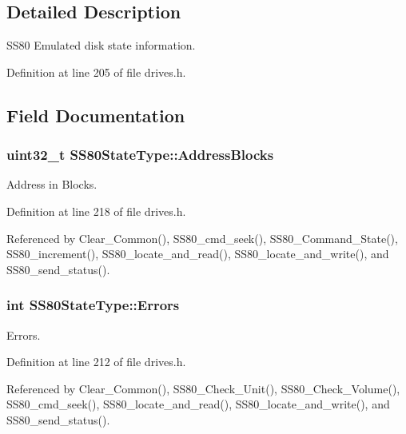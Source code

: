 \subsection{Detailed Description}
S\+S80 Emulated disk state information. 

Definition at line 205 of file drives.\+h.



\subsection{Field Documentation}
\subsubsection[{\texorpdfstring{Address\+Blocks}{AddressBlocks}}]{\setlength{\rightskip}{0pt plus 5cm}uint32\+\_\+t S\+S80\+State\+Type\+::\+Address\+Blocks}\hypertarget{structSS80StateType_a6cffa1e36a57bce4188ede4bd9dbd7ad}{}\label{structSS80StateType_a6cffa1e36a57bce4188ede4bd9dbd7ad}


Address in Blocks. 



Definition at line 218 of file drives.\+h.



Referenced by Clear\+\_\+\+Common(), S\+S80\+\_\+cmd\+\_\+seek(), S\+S80\+\_\+\+Command\+\_\+\+State(), S\+S80\+\_\+increment(), S\+S80\+\_\+locate\+\_\+and\+\_\+read(), S\+S80\+\_\+locate\+\_\+and\+\_\+write(), and S\+S80\+\_\+send\+\_\+status().

\subsubsection[{\texorpdfstring{Errors}{Errors}}]{\setlength{\rightskip}{0pt plus 5cm}int S\+S80\+State\+Type\+::\+Errors}\hypertarget{structSS80StateType_a7a5c363c6f617ee457a4daacadb3a7b2}{}\label{structSS80StateType_a7a5c363c6f617ee457a4daacadb3a7b2}


Errors. 



Definition at line 212 of file drives.\+h.



Referenced by Clear\+\_\+\+Common(), S\+S80\+\_\+\+Check\+\_\+\+Unit(), S\+S80\+\_\+\+Check\+\_\+\+Volume(), S\+S80\+\_\+cmd\+\_\+seek(), S\+S80\+\_\+locate\+\_\+and\+\_\+read(), S\+S80\+\_\+locate\+\_\+and\+\_\+write(), and S\+S80\+\_\+send\+\_\+status().

